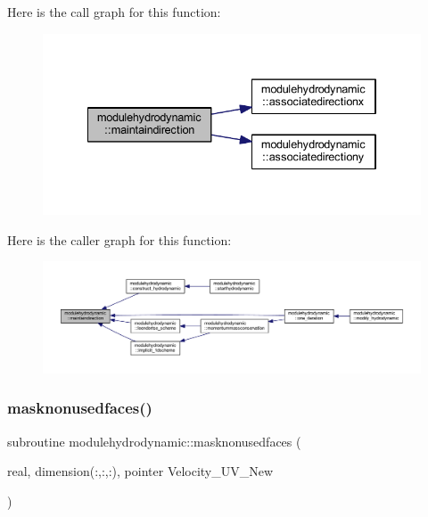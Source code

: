 Here is the call graph for this function\+:\nopagebreak
\begin{figure}[H]
\begin{center}
\leavevmode
\includegraphics[width=334pt]{namespacemodulehydrodynamic_a178f5e060ebc6d1ddcb0e70a9c9e95c2_cgraph}
\end{center}
\end{figure}
Here is the caller graph for this function\+:\nopagebreak
\begin{figure}[H]
\begin{center}
\leavevmode
\includegraphics[width=350pt]{namespacemodulehydrodynamic_a178f5e060ebc6d1ddcb0e70a9c9e95c2_icgraph}
\end{center}
\end{figure}
\mbox{\label{namespacemodulehydrodynamic_ab4a3acec600d04e2afbf5acc7f68b642}} 
\subsubsection{\texorpdfstring{masknonusedfaces()}{masknonusedfaces()}}
{\footnotesize\ttfamily subroutine modulehydrodynamic\+::masknonusedfaces (\begin{DoxyParamCaption}\item[{real, dimension(\+:,\+:,\+:), pointer}]{Velocity\+\_\+\+U\+V\+\_\+\+New }\end{DoxyParamCaption})\hspace{0.3cm}{\ttfamily [private]}}

